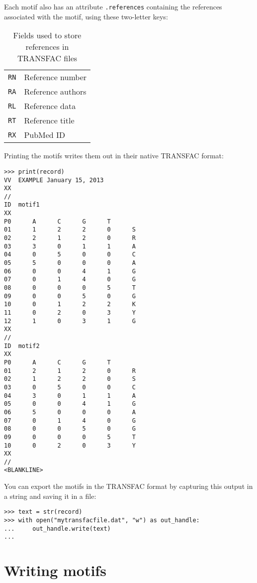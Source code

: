 Each motif also has an attribute \verb+.references+ containing the
references associated with the motif, using these two-letter keys:

\begin{table}[h]
\begin{center}
\caption{Fields used to store references in TRANSFAC files}
\begin{tabular}{|l|l||}
\verb+RN+ & Reference number \\
\verb+RA+ & Reference authors \\
\verb+RL+ & Reference data \\
\verb+RT+ & Reference title \\
\verb+RX+ & PubMed ID \\
\end{tabular}
\end{center}
\end{table}

Printing the motifs writes them out in their native TRANSFAC format:

\begin{verbatim}
>>> print(record)
VV  EXAMPLE January 15, 2013
XX
//
ID  motif1
XX
P0      A      C      G      T
01      1      2      2      0      S
02      2      1      2      0      R
03      3      0      1      1      A
04      0      5      0      0      C
05      5      0      0      0      A
06      0      0      4      1      G
07      0      1      4      0      G
08      0      0      0      5      T
09      0      0      5      0      G
10      0      1      2      2      K
11      0      2      0      3      Y
12      1      0      3      1      G
XX
//
ID  motif2
XX
P0      A      C      G      T
01      2      1      2      0      R
02      1      2      2      0      S
03      0      5      0      0      C
04      3      0      1      1      A
05      0      0      4      1      G
06      5      0      0      0      A
07      0      1      4      0      G
08      0      0      5      0      G
09      0      0      0      5      T
10      0      2      0      3      Y
XX
//
<BLANKLINE>
\end{verbatim}
You can export the motifs in the TRANSFAC format by capturing this output
in a string and saving it in a file:
\begin{verbatim}
>>> text = str(record)
>>> with open("mytransfacfile.dat", "w") as out_handle:
...     out_handle.write(text)
...
\end{verbatim}

\section{Writing motifs}

